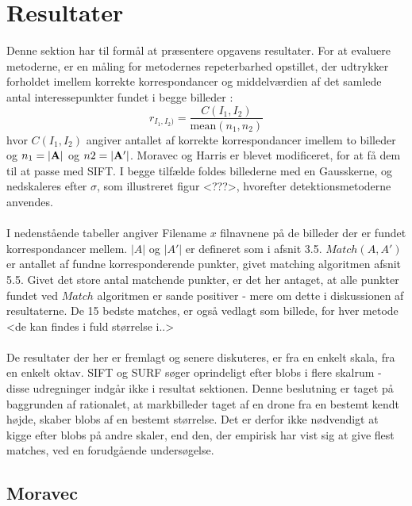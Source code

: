 \chapter{Resultater}
Denne sektion har til formål at præsentere opgavens resultater. For at evaluere metoderne, er en måling for metodernes repeterbarhed opstillet, der udtrykker forholdet imellem korrekte korrespondancer og middelværdien af det samlede antal interessepunkter fundet i begge billeder \cite{eval}:
\begin{equation}
r_{I_1,I_2)}=\dfrac{C(I_1,I_2)}{\text{mean}(n_1,n_2)}
\end{equation}
hvor $C(I_1,I_2)$ angiver antallet af korrekte korrespondancer imellem to billeder og $n_1=\bold{|A|}$ og $n2=\bold{|A'|}$.
Moravec og Harris er blevet modificeret, for at få dem til at passe med SIFT. I begge tilfælde foldes billederne med en Gausskerne, og nedskaleres efter $\sigma$, som illustreret figur <???>, hvorefter detektionsmetoderne anvendes. 
\\
\\
I nedenstående tabeller angiver Filename $x$ filnavnene på de billeder der er fundet korrespondancer mellem. $|A|$ og $|A'|$ er defineret som i afsnit 3.5. $Match(A, A')$ er antallet af fundne korresponderende punkter, givet matching algoritmen afsnit 5.5. Givet det store antal matchende punkter, er det her antaget, at alle punkter fundet ved $Match$ algoritmen er sande positiver - mere om dette i diskussionen af resultaterne. De 15 bedste matches, er også vedlagt som billede, for hver metode <de kan findes i fuld størrelse i..>
\\
\\
De resultater der her er fremlagt og senere diskuteres, er fra en enkelt skala, fra en enkelt oktav. SIFT og SURF søger oprindeligt efter blobs i flere skalrum - disse udregninger indgår ikke i resultat sektionen. Denne beslutning er taget på baggrunden af rationalet, at markbilleder taget af en drone fra en bestemt kendt højde, skaber blobs af en bestemt størrelse. Det er derfor ikke nødvendigt at kigge efter blobs på andre skaler, end den, der empirisk har vist sig at give flest matches, ved en forudgående undersøgelse.



\section{Moravec}
